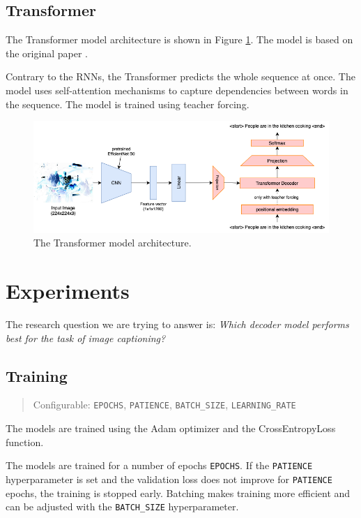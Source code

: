 \documentclass[12pt]{article}
\theoremstyle{plain}
\theoremstyle{definition}
\theoremstyle{remark}
\begin{document}
\subsection{Transformer}\label{sec:transformer}
The Transformer model architecture is shown in Figure \ref{fig:transformer}. The model is based on the original paper \cite{vaswani2017attention}.
\par Contrary to the RNNs, the Transformer predicts the whole sequence at once. The model uses self-attention mechanisms to capture dependencies between words in the sequence. The model is trained using teacher forcing.
\begin{figure}[H]
    \centering
    \includegraphics[width=.7\textwidth]{res/transformer.png}
    \caption{The Transformer model architecture.}\label{fig:transformer}
\end{figure}



\section{Experiments}\label{sec:experiments}
The research question we are trying to answer is: \textit{Which decoder model performs best for the task of image captioning?}

\subsection{Training}\label{sec:training}
\begin{quote}\center Configurable: \texttt{EPOCHS}, \texttt{PATIENCE}, \texttt{BATCH\_SIZE}, \texttt{LEARNING\_RATE}\end{quote}
\par The models are trained using the Adam optimizer and the CrossEntropyLoss function.
\par The models are trained for a number of epochs \texttt{EPOCHS}. If the \texttt{PATIENCE} hyperparameter is set and the validation loss does not improve for \texttt{PATIENCE} epochs, the training is stopped early. Batching makes training more efficient and can be adjusted with the \texttt{BATCH\_SIZE} hyperparameter.
\end{document}
